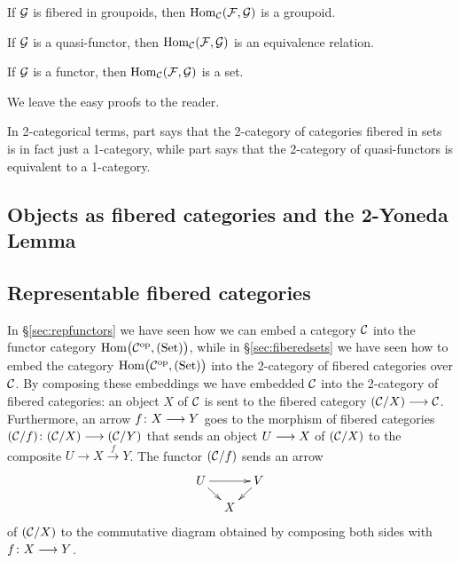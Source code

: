 \begin{3   FIBERED CATEGORIES}
\begin{3.5 Equivalences of fibered categories}
\begin{proposition}\hfil
\begin{enumeratei}

 If $\mathcal{G}$ is fibered in groupoids, then $\operatorname{Hom}_{\mathcal{C}}(\mathcal{F}, \mathcal{G})$ is a groupoid.

 If $\mathcal{G}$ is a quasi-functor, then $\operatorname{Hom}_{\mathcal{C}}(\mathcal{F}, \mathcal{G})$ is an equivalence relation.

 If $\mathcal{G}$ is a functor, then $\operatorname{Hom}_{\mathcal{C}}(\mathcal{F}, \mathcal{G})$ is a set.

\end{enumeratei}
\end{proposition}

We leave the easy proofs to the reader.

In 2-categorical terms, part  says that the 2-category of categories fibered in sets is in fact just a 1-category, while part  says that the 2-category of quasi-functors is equivalent to a 1-category.

\end{3.5 Equivalences of fibered categories}
\begin{3.6 Objects as fibcats and the 2-Yoneda}
\setcounter{section}{5}
\section{Objects as fibered categories and the 2-Yoneda Lemma}

\subsection{Representable fibered categories}

In \S\ref{sec:repfunctors} we have seen how we can embed a category $\mathcal{C}$ into the functor category $\mathrm{Hom}\bigl(\mathcal{C}^{\mathrm{op}}, (\mathrm{Set})\bigr)$, while in \S\ref{sec:fiberedsets} we have seen how to embed the category $\mathrm{Hom}\bigl(\mathcal{C}^{\mathrm{op}}, (\mathrm{Set})\bigr)$ into the 2-category of fibered categories over $\mathcal{C}$. By composing these embeddings we have embedded $\mathcal{C}$ into the 2-category of fibered categories: an object $X$ of $\mathcal{C}$ is sent to the fibered category $(\cC/X) \arr \cC$. Furthermore, an arrow $f \colon X \arr Y$ goes to the morphism of fibered categories $(\cC/f) \colon (\cC/X) \arr (\cC/Y)$ that sends an object $U \arr X$ of $(\mathcal{C}/X)$ to the composite $U \to X \overset f \to Y$. The functor $(\mathcal{C}/f)$ sends an arrow
   \[
   \xymatrix@-15pt{
   U\ar[rd]\ar[rr]&&V\ar[ld]\\
   &X&
   }
   \]
of $(\mathcal{C}/X)$ to the commutative diagram obtained by composing both sides with $f \colon X \arr Y$. 


\end{3.6 Objects as fibcats and the 2-Yoneda}
\end{3   FIBERED CATEGORIES}
